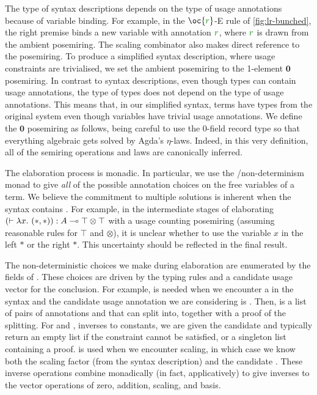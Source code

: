 The type of syntax descriptions depends on the type of usage annotations because
of variable binding.
For example, in the $\oc{\gr r}$-E rule of \cref{fig:lr-bunched}, the right
premise binds a new variable with annotation $\gr r$, where $\gr r$ is drawn
from the ambient posemiring.
The scaling combinator also makes direct reference to the posemiring.
To produce a simplified syntax description, where usage constraints are
trivialised, we set the ambient posemiring to the 1-element $\mathbf0$
posemiring.
In contrast to syntax descriptions, even though types can contain usage
annotations, the type of types does not depend on the type of usage annotations.
This means that, in our simplified syntax, terms have types from the original
system even though variables have trivial usage annotations.
We define the $\mathbf0$ posemiring as follows, being careful to use the
0-field record type \AgdaRecord{$\top$} so that everything algebraic gets
solved by Agda's $\eta$-laws.
Indeed, in this very definition, all of the semiring operations and laws are
canonically inferred.


The elaboration process is monadic.
In particular, we use the /non-determinism monad to give
\emph{all} of the possible annotation choices on the free variables of a term.
We believe the commitment to multiple solutions is inherent when the syntax
contains .
For example, in the intermediate stages of elaborating
$\plr{\vdash \lambda x.~\plr{*,*}} : A \multimap \top \otimes \top$ with a
usage counting posemiring (assuming reasonable rules for $\top$ and $\otimes$),
it is unclear whether to use the variable $x$ in the left $*$ or the right $*$.
This uncertainty should be reflected in the final result.

The non-deterministic choices we make during elaboration are enumerated by
the fields of .
These choices are driven by the typing rules and a candidate usage vector for
the conclusion.
For example, \AgdaSpace{} is needed when we
encounter a  in the syntax and the candidate
usage annotation we are considering is .
Then, \AgdaSpace{} is a list of pairs of
annotations  and  that  can split into,
together with a proof of the splitting.
For  and , inverses to constants,
we are given the candidate  and typically return an empty list if
the constraint cannot be satisfied, or a singleton list containing a proof.
 is used when we encounter scaling, in which case we know
both the scaling factor  (from the syntax description) and the
candidate .
These inverse operations combine monadically (in fact, applicatively) to give
inverses to the vector operations of zero, addition, scaling, and basis.

